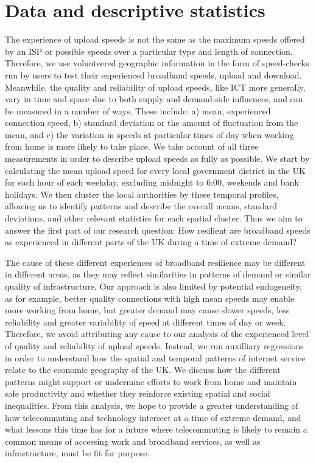 \documentclass[]{interact}
\theoremstyle{plain}%
\theoremstyle{definition}
\theoremstyle{remark}
\begin{document}
\hypertarget{data-and-descriptive-statistics}{%
\section{Data and descriptive
statistics}\label{data-and-descriptive-statistics}}

The experience of upload speeds is not the same as the maximum speeds
offered by an ISP or possible speeds over a particular type and length
of connection. Therefore, we use volunteered geographic information in
the form of speed-checks run by users to test their experienced
broadband speeds, upload and download. Meanwhile, the quality and
reliability of upload speeds, like ICT more generally, vary in time and
space due to both supply and demand-side influences, and can be measured
in a number of ways. These include: a) mean, experienced connection
speed, b) standard deviation or the amount of fluctuation from the mean,
and c) the variation in speeds at particular times of day when working
from home is more likely to take place. We take account of all three
measurements in order to describe upload speeds as fully as possible. We
start by calculating the mean upload speed for every local government
district in the UK for each hour of each weekday, excluding midnight to
6:00, weekends and bank holidays. We then cluster the local authorities
by these temporal profiles, allowing us to identify patterns and
describe the overall means, standard deviations, and other relevant
statistics for each spatial cluster. Thus we aim to answer the first
part of our research question: How resilient are broadband speeds as
experienced in different parts of the UK during a time of extreme
demand?

The cause of these different experiences of broadband resilience may be
different in different areas, as they may reflect similarities in
patterns of demand or similar quality of infrastructure. Our approach is
also limited by potential endogeneity, as for example, better quality
connections with high mean speeds may enable more working from home, but
greater demand may cause slower speeds, less reliability and greater
variability of speed at different times of day or week. Therefore, we
avoid attributing any cause to our analysis of the experienced level of
quality and reliability of upload speeds. Instead, we run auxilliary
regressions in order to understand how the spatial and temporal patterns
of internet service relate to the economic geography of the UK. We
discuss how the different patterns might support or undermine efforts to
work from home and maintain safe productivity and whether they reinforce
existing spatial and social inequalities. From this analysis, we hope to
provide a greater understanding of how telecommuting and technology
intersect at a time of extreme demand, and what lessons this time has
for a future where telecommuting is likely to remain a common means of
accessing work and broadband services, as well as infrastructure, must
be fit for purpose.
\end{document}
